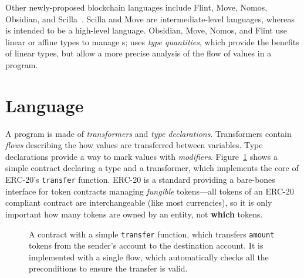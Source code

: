 \documentclass[dvipsnames,runningheads]{llncs}
\begin{document}
Other newly-proposed blockchain languages include Flint, Move, Nomos, Obsidian, and Scilla~\cite{schrans2018flint,blackshear2019move,das2019nomos,coblenz2019obsidian,sergey2019scilla}.
Scilla and Move are intermediate-level languages, whereas \langName is intended to be a high-level language.
Obsidian, Move, Nomos, and Flint use linear or affine types to manage \assetTxt{}s; \langName uses \emph{type quantities}, which provide the benefits of linear types, but allow a more precise analysis of the flow of values in a program.

\section{Language}\label{sec:lang}
A \langName program is made of \emph{transformers} and \emph{type declarations}.
Transformers contain \emph{flows} describing the how values are transferred between variables.
Type declarations provide a way to mark values with \emph{modifiers}. %
Figure~\ref{fig:erc20-transfer-flow} shows a simple contract declaring a type and a transformer, which implements the core of ERC-20's \lstinline{transfer} function.
ERC-20 is a standard providing a bare-bones interface for token contracts managing \emph{fungible} tokens---all tokens of an ERC-20 compliant contract are interchangeable (like most currencies), so it is only important how many tokens are owned by an entity, not \textbf{which} tokens.

\begin{figure}
    \vspace{-2em}
    \centering
    
    \vspace{-1em}
    \caption{A \langName contract with a simple \lstinline{transfer} function, which transfers \lstinline{amount} tokens from the sender's account to the destination account.
It is implemented with a single flow, which automatically checks all the preconditions to ensure the transfer is valid.}
    \label{fig:erc20-transfer-flow}
    \vspace{-2em}
\end{figure}
\end{document}
